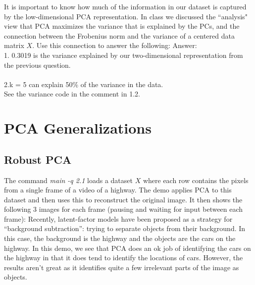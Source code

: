 \documentclass{article}
\begin{document}
It is important to know how much of the information in our dataset is captured by the low-dimensional PCA representation.
In class we discussed the ``analysis" view that PCA maximizes the variance that is explained by the PCs, and the connection between the Frobenius norm and the variance of a centered data matrix $X$. Use this connection to answer the following:
Answer:\\

1. 0.3019 is the variance explained by our two-dimensional representation from the previous question.\\
\\
2.k = 5 can explain 50\% of the variance in the data.\\See the variance code in the comment in 1.2.


\section{PCA Generalizations}


\subsection{Robust PCA}

The command \emph{main -q 2.1} loads a dataset $X$ where each row contains the pixels from a single frame of a video of a highway. The demo applies PCA to this dataset and then uses this to reconstruct the original image. 
It then shows the following 3 images for each frame (pausing and waiting for input between each frame):
Recently, latent-factor models have been proposed as a strategy for ``background subtraction'': trying to separate objects from their background. In this case, the background is the highway and the objects are the cars on the highway. In this demo, we see that PCA does an ok job of identifying the cars on the highway in that it does tend to identify the locations of cars. However, the results aren't great as it identifies quite a few irrelevant parts of the image as objects.
\end{document}
